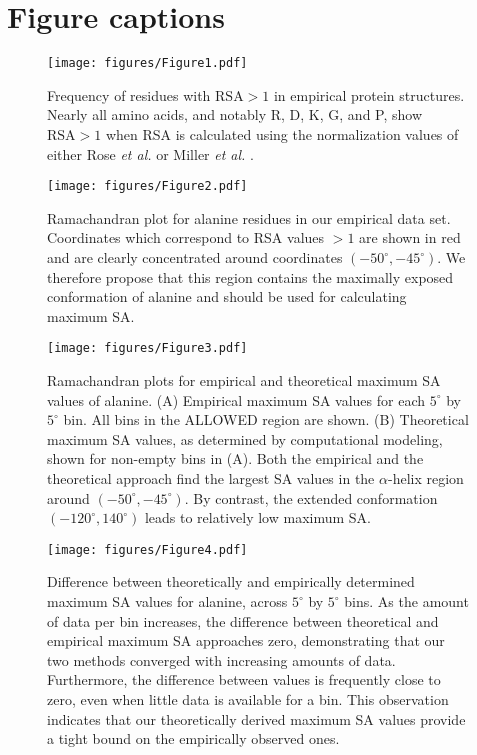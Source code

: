 \documentclass[11pt]{article}
\begin{document}



\newpage

\section*{Figure captions}

\begin{figure}[H]
\texttt{[image: figures/Figure1.pdf]}
\caption{\label{fig:BarGraphRSA}Frequency of residues with $\text{RSA}>1$ in empirical protein structures. Nearly all amino acids, and notably R, D, K, G, and P, show $\text{RSA}>1$ 
when RSA is calculated using the normalization values of either Rose \emph{et al.} \cite{Rose1985} or Miller \emph{et al.} \cite{Miller1987}.}
\end{figure}

\begin{figure}[H]
\texttt{[image: figures/Figure2.pdf]}
\caption{\label{fig:RamaAla}Ramachandran plot for alanine residues in our empirical data set. Coordinates which correspond to RSA values $>1$ are shown in red and are clearly concentrated around coordinates $(-50^\circ,-45^\circ)$. We therefore propose that this region contains the maximally exposed conformation of alanine and should be used for calculating maximum SA.}
\end{figure}

\begin{figure}[H]
\texttt{[image: figures/Figure3.pdf]}
\caption{\label{fig:heatrama} Ramachandran plots for empirical and theoretical maximum SA values of alanine. (A) Empirical maximum SA values for each $5^\circ$ by $5^\circ$ bin. All bins in the ALLOWED region are shown. (B) Theoretical maximum SA values, as determined by computational modeling, shown for non-empty bins in (A). Both the empirical and the theoretical approach find the largest SA values in the $\alpha$-helix region around $(-50^\circ,-45^\circ)$. By contrast, the extended conformation $(-120^\circ, 140^\circ)$ leads to relatively low maximum SA.}
\end{figure}


\begin{figure}[H]
\texttt{[image: figures/Figure4.pdf]}
\caption{\label{fig:EvC} Difference between theoretically and empirically determined maximum SA values for alanine, across $5^\circ$ by $5^\circ$ bins. As the amount of data per bin increases, the difference between theoretical and empirical maximum SA approaches zero, demonstrating that our two methods converged with increasing amounts of data. Furthermore, the difference between values is frequently close to zero, even when little data is available for a bin. This observation indicates that our theoretically derived maximum SA values provide a tight bound on the empirically observed ones.}
\end{figure}
\end{document}

